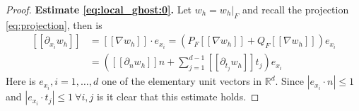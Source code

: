\documentclass[11pt]{article}
\theoremstyle{remark}
\newcommand{\jump}[1]{\left[\!\left[ #1 \right]\!\right]}
\newcommand{\abs}[1]{\left\lvert #1 \right\rvert}
\renewcommand{\le}{\leqslant}
\numberwithin{equation}{section}
\begin{document}
\begin{proof}
\textbf{Estimate \eqref{eq:local_ghost:0}.} Let $w_{h} = w_{h}|_F$ and recall the projection \eqref{eq:projection}, then is
\begin{equation}
    \begin{split}
\jump{ \partial _{x_{i}} w_{h}} & = \jump{ \nabla w_{h} }   \cdot e_{x_{i}}  = ( P_{F} \jump{ \nabla w_{h} }   + Q_{F}  \jump{ \nabla w_{h} }   )e_{x_{i}} \\
 &   = ( \jump{\partial _{n}    w_{h} }    n + \sum_{j=1}^{d-1}  \jump{\partial_{ t_{j} } w_{h} }    t_{j} )e_{x_{i}}
    \end{split}
\end{equation}
Here is $e_{x_{i}}, i= 1,\ldots,d$ one of the elementary unit vectors in $\mathbb{R} ^{d}$.
Since $\abs{e_{x_{i}} \cdot n  }\le 1 $ and $\abs{e_{x_{i}} \cdot  t_{j} }\le 1 \ \forall i,j $ is it clear that this estimate holds.


\end{proof}
\end{document}
